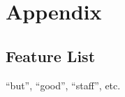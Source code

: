 \section{Appendix}

\subsection{Feature List}
\label{app:feature-list}

``but'', ``good'', ``staff'', etc.
